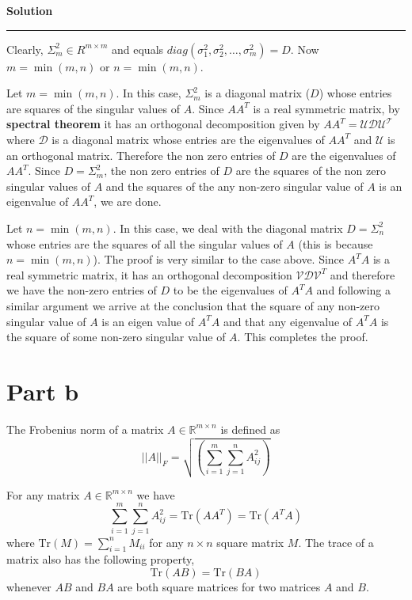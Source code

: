 \documentclass[a4paper,12pt]{article}
\newenvironment{solution}[2][]{%
    \begin{mdframed}[linecolor=blue!70!black, linewidth=2pt, roundcorner=10pt, backgroundcolor=yellow!10!white, skipabove=12pt, skipbelow=12pt]%
        \textbf{\large #2}
        \par\noindent\rule{\textwidth}{0.4pt}
}{
    \end{mdframed}
}
\begin{document}
\begin{solution}{Solution}
      Clearly, $\Sigma^{2}_{m} \in R^{m \times m}$ and equals $diag(\sigma_{1}^{2},\sigma_{2}^{2},\dots , \sigma_{m}^{2}) = D$.
      Now $m = \min(m,n)$ or $n = \min(m,n)$.  

      Let $m = \min(m,n)$. In this case, $\Sigma_{m}^{2}$ is a diagonal matrix ($D$) whose entries are squares of the singular 
      values of $A$. Since $AA^{T}$ is a real symmetric matrix, by \textbf{spectral theorem}  it has an orthogonal decomposition given by 
      $AA^{T} = \mathcal{U} \mathcal{D} \mathcal{U^{T}}$ where $\mathcal{D}$ is a diagonal matrix whose entries are the eigenvalues
      of $AA^{T}$ and $\mathcal{U}$ is an orthogonal matrix. Therefore the non zero entries of $D$ are the eigenvalues of $AA^{T}$.
      Since $D = \Sigma_{m}^{2}$, the non zero entries of $D$ are the squares of the non zero singular values of $A$ and the squares of the any 
      non-zero singular value of $A$ is an eigenvalue of $AA^{T}$, we are done.

      Let $n = \min(m,n)$. In this case, we deal with the diagonal matrix $D = \Sigma_{n}^{2}$ whose entries are the squares of 
      all the singular values of $A$ (this is because $n = \min(m,n)$). The proof is very similar to the case above. Since
      $A^{T}A$ is a real symmetric matrix, it has an orthogonal decomposition $\mathcal{V} \mathcal{D} \mathcal{V}^{T}$
      and therefore we have the non-zero entries of $D$ to be the eigenvalues of $A^{T}A$ and following a similar argument we 
      arrive at the conclusion that the square of any non-zero singular value of $A$ is an eigen value of $A^{T}A$ and that
      any eigenvalue of $A^{T}A$ is the square of some non-zero singular value of $A$. This completes the proof.
      
      \section*{Part b}

      The Frobenius norm of a matrix $A \in \mathbb{R}^{m \times n}$ is defined as 
      \[\left \lvert \lvert A \right \rvert \rvert_{F} = \sqrt{\left(\sum\limits_{i = 1}^{m} \sum\limits_{j = 1}^{n} A_{ij}^{2}\right)} \]

      For any matrix $A \in \mathbb{R}^{m \times n}$ we have 
      \[ \sum\limits_{i = 1}^{m}\sum\limits_{j = 1}^{n} A_{ij}^{2} = \text{Tr}(AA^{T}) = \text{Tr}(A^{T}A)\] where $\text{Tr}(M) = \sum\limits_{i = 1}^{n} M_{ii}$
      for any $n \times n$ square matrix $M$. The trace of a matrix also has the following property,
      \[\text{Tr}(AB) = \text{Tr}(BA)\] whenever $AB$ and $BA$ are both square matrices for two matrices $A$ and $B$.


\end{solution}
\end{document}
